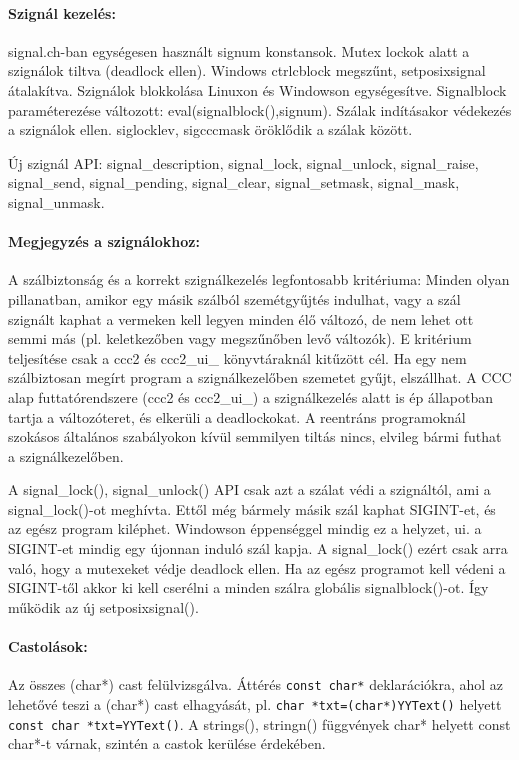 \begin{description}
  \paragraph{Szignál kezelés:}\label{SIGNAL}
    signal.ch-ban egységesen használt signum konstansok.
    Mutex lockok alatt a szignálok tiltva (deadlock ellen).
    Windows ctrlcblock megszűnt, setposixsignal átalakítva.
    Szignálok blokkolása Linuxon és Windowson egységesítve.
    Signalblock paraméterezése változott: eval(signalblock(),signum).
    Szálak indításakor védekezés a szignálok ellen.
    siglocklev, sigcccmask öröklődik a szálak között.

    Új szignál API: 
        signal\_description, signal\_lock, signal\_unlock,
        signal\_raise, signal\_send, signal\_pending, signal\_clear, 
        signal\_setmask, signal\_mask, signal\_unmask.

  \paragraph{Megjegyzés a szignálokhoz:}
    A szálbiztonság és a korrekt szignálkezelés legfontosabb
    kritériuma: Minden olyan pillanatban, amikor egy másik 
    szálból szemétgyűjtés indulhat, vagy a szál szignált kaphat 
    a vermeken kell legyen minden élő változó, de nem lehet 
    ott semmi más (pl. keletkezőben vagy megszűnőben levő változók). 
    E kritérium  teljesítése csak a ccc2 és ccc2\_ui\_ könyvtáraknál 
    kitűzött cél. Ha egy nem szálbiztosan megírt program 
    a szignálkezelőben  szemetet gyűjt, elszállhat.
    A CCC alap futtatórendszere (ccc2 és ccc2\_ui\_) a szignálkezelés 
    alatt is ép állapotban tartja a változóteret, és elkerüli 
    a deadlockokat.  A reentráns programoknál szokásos általános
    szabályokon kívül semmilyen tiltás nincs, elvileg  bármi
    futhat a szignálkezelőben.

    A signal\_lock(), signal\_unlock() API csak azt a szálat védi
    a szignáltól, ami a signal\_lock()-ot meghívta. Ettől még bármely
    másik szál kaphat SIGINT-et, és az egész program kiléphet.
    Windowson éppenséggel mindig ez a helyzet, ui. a SIGINT-et
    mindig egy újonnan induló szál kapja. A signal\_lock() ezért
    csak arra való, hogy a mutexeket védje deadlock ellen.
    Ha az egész programot kell védeni a SIGINT-től akkor ki kell
    cserélni a minden szálra globális signalblock()-ot. Így
    működik az új setposixsignal().

  \paragraph{Castolások:}
    Az összes (char*) cast felülvizsgálva.
    Áttérés \verb!const char*! deklarációkra, ahol az lehetővé teszi 
    a  (char*) cast elhagyását, pl. \verb!char *txt=(char*)YYText()! 
    helyett   \verb!const char *txt=YYText()!.
    A strings(), stringn() függvények char* helyett const char*-t 
    várnak, szintén a castok kerülése érdekében.
    

\end{description}
